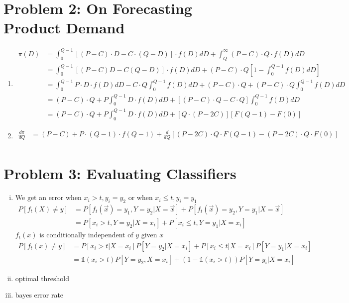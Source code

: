 \documentclass[twoside,11pt]{homework}
\begin{document}
\section*{Problem 2: On Forecasting Product Demand}
\begin{enumerate}
	\item 
	\begin{equation*}
	\begin{split}
	\pi(D) &= \int_{0}^{Q-1}[(P-C)\cdot D-C\cdot (Q-D)]\cdot f(D)dD+\int_{Q}^{\infty}(P-C)\cdot Q\cdot f(D)dD\\
	&= \int_{0}^{Q-1}[(P-C)D-C(Q-D)]\cdot f(D)dD+(P-C)\cdot Q[ 1-\int_{0}^{Q-1}f(D)dD]\\
	&=\int_{0}^{Q-1}P\cdot D\cdot f(D)dD-C\cdot Q\int_{0}^{Q-1}f(D)dD+(P-C)\cdot Q+(P-C)\cdot Q \int_{0}^{Q-1}f(D)dD\\
	&=(P-C)\cdot Q+P\int_{0}^{Q-1}D\cdot f(D) dD + [(P-C)\cdot Q-C\cdot Q]\int_{0}^{Q-1}f(D)dD\\
	&=(P-C)\cdot Q+P\int_{0}^{Q-1}D\cdot f(D)dD+[Q\cdot(P-2C)][F(Q-1)-F(0)]
	\end{split}
	\end{equation*}
	\item 
	\begin{equation*}
	\begin{split}
	\frac{d\pi}{dQ}&=(P-C)+P\cdot(Q-1)\cdot f(Q-1)+\frac{d}{dQ}[(P-2C)\cdot Q\cdot F(Q-1)-(P-2C)\cdot Q \cdot F(0)]\\
	\end{split}
	\end{equation*}
\end{enumerate}

\section*{Problem 3: Evaluating Classifiers}
\begin{enumerate}[(i)]
	\item We get an error when $x_i>t,y_i=y_2$ or when $x_i\leq t,y_i=y_1$\\
	\begin{equation*}
	\begin{split}
	P[f_t(X)\neq y]&=P[f_t(\vec{x})=y_1,Y=y_2|X=\vec{x}]+P[f_t(\vec{x})=y_2,Y=y_1|X=\vec{x}]\\
	&=P[x_i>t,Y=y_2|X=x_i]+P[x_i\leq t,Y=y_1|X=x_i]
	\end{split}
	\end{equation*}
	$f_t(x)$ is conditionally independent of $y$ given $x$
	\begin{equation*}
	\begin{split}
	P[f_t(x)\neq y]&=P[x_i>t|X=x_i]P[Y=y_2|X=x_i]+P[x_i\leq t|X=x_i]P[Y=y_1|X=x_i]\\
	&=\mathbb{1}(x_i>t)P[Y=y_2,X=x_i]+(1-\mathbb{1}(x_i>t))P[Y=y_i|X=x_i]
	\end{split}
	\end{equation*}
	\item optimal threshold
	\item bayes error rate
\end{enumerate}
\end{document}
